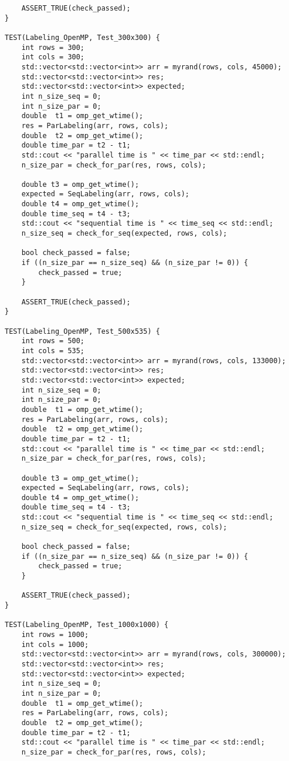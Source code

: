 \documentclass{report}
\begin{document}
\begin{lstlisting}
    ASSERT_TRUE(check_passed);
}

TEST(Labeling_OpenMP, Test_300x300) {
    int rows = 300;
    int cols = 300;
    std::vector<std::vector<int>> arr = myrand(rows, cols, 45000);
    std::vector<std::vector<int>> res;
    std::vector<std::vector<int>> expected;
    int n_size_seq = 0;
    int n_size_par = 0;
    double  t1 = omp_get_wtime();
    res = ParLabeling(arr, rows, cols);
    double  t2 = omp_get_wtime();
    double time_par = t2 - t1;
    std::cout << "parallel time is " << time_par << std::endl;
    n_size_par = check_for_par(res, rows, cols);

    double t3 = omp_get_wtime();
    expected = SeqLabeling(arr, rows, cols);
    double t4 = omp_get_wtime();
    double time_seq = t4 - t3;
    std::cout << "sequential time is " << time_seq << std::endl;
    n_size_seq = check_for_seq(expected, rows, cols);

    bool check_passed = false;
    if ((n_size_par == n_size_seq) && (n_size_par != 0)) {
        check_passed = true;
    }

    ASSERT_TRUE(check_passed);
}

TEST(Labeling_OpenMP, Test_500x535) {
    int rows = 500;
    int cols = 535;
    std::vector<std::vector<int>> arr = myrand(rows, cols, 133000);
    std::vector<std::vector<int>> res;
    std::vector<std::vector<int>> expected;
    int n_size_seq = 0;
    int n_size_par = 0;
    double  t1 = omp_get_wtime();
    res = ParLabeling(arr, rows, cols);
    double  t2 = omp_get_wtime();
    double time_par = t2 - t1;
    std::cout << "parallel time is " << time_par << std::endl;
    n_size_par = check_for_par(res, rows, cols);

    double t3 = omp_get_wtime();
    expected = SeqLabeling(arr, rows, cols);
    double t4 = omp_get_wtime();
    double time_seq = t4 - t3;
    std::cout << "sequential time is " << time_seq << std::endl;
    n_size_seq = check_for_seq(expected, rows, cols);

    bool check_passed = false;
    if ((n_size_par == n_size_seq) && (n_size_par != 0)) {
        check_passed = true;
    }

    ASSERT_TRUE(check_passed);
}

TEST(Labeling_OpenMP, Test_1000x1000) {
    int rows = 1000;
    int cols = 1000;
    std::vector<std::vector<int>> arr = myrand(rows, cols, 300000);
    std::vector<std::vector<int>> res;
    std::vector<std::vector<int>> expected;
    int n_size_seq = 0;
    int n_size_par = 0;
    double  t1 = omp_get_wtime();
    res = ParLabeling(arr, rows, cols);
    double  t2 = omp_get_wtime();
    double time_par = t2 - t1;
    std::cout << "parallel time is " << time_par << std::endl;
    n_size_par = check_for_par(res, rows, cols);


\end{lstlisting}
\end{document}
